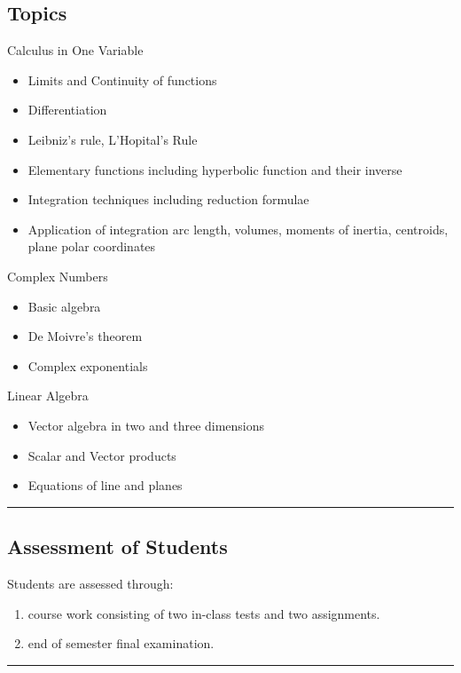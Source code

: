 \subsection*{Topics}
\begin{outline}
    \1 Calculus in One Variable
    \begin{itemize}
        \item Limits and Continuity of functions
        \item Differentiation
        \item Leibniz's rule, L'Hopital's Rule
        \item Elementary functions including hyperbolic function and their inverse
        \item Integration techniques including reduction formulae
        \item Application of integration \newline arc length, volumes, moments of inertia, centroids, plane polar coordinates
    \end{itemize}
    \1 Complex Numbers
    \begin{itemize}
        \item Basic algebra
        \item De Moivre's theorem
        \item Complex exponentials
    \end{itemize}
    \1 Linear Algebra
    \begin{itemize}
        \item Vector algebra in two and three dimensions
        \item Scalar and Vector products
        \item Equations of line and planes
    \end{itemize}
\end{outline}
\vspace{2ex} \hrule\vspace{2ex}

\subsection*{Assessment of Students}
\begin{outline}
    \1 Students are assessed through:
    \begin{enumerate}
        \item course work consisting of two in-class tests and two assignments.
        \item end of semester final examination.
    \end{enumerate}

\end{outline}
\vspace{2ex}\hrule\vspace{2ex}

